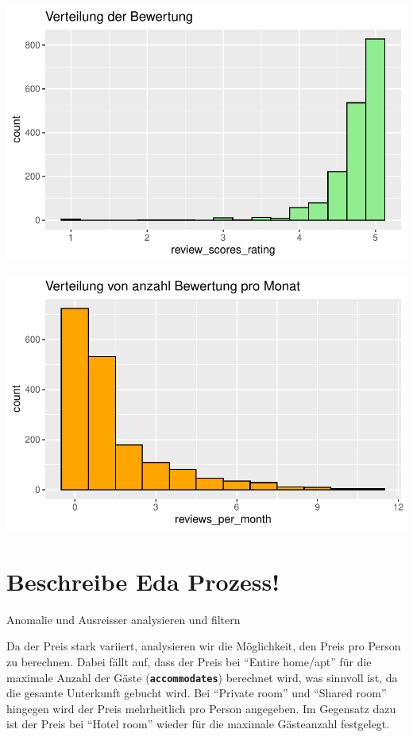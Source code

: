 \documentclass[
  journal,
]{IEEEtran}%
\begin{document}
\includegraphics{main_files/figure-pdf/eda-2.pdf}

\includegraphics{main_files/figure-pdf/eda-3.pdf}

\section{Beschreibe Eda Prozess!}\label{beschreibe-eda-prozess}

Anomalie und Ausreisser analysieren und filtern

Da der Preis stark variiert, analysieren wir die Möglichkeit, den Preis
pro Person zu berechnen. Dabei fällt auf, dass der Preis bei ``Entire
home/apt'' für die maximale Anzahl der Gäste
(\textbf{\texttt{accommodates}}) berechnet wird, was sinnvoll ist, da
die gesamte Unterkunft gebucht wird. Bei ``Private room'' und ``Shared
room'' hingegen wird der Preis mehrheitlich pro Person angegeben. Im
Gegensatz dazu ist der Preis bei ``Hotel room'' wieder für die maximale
Gästeanzahl festgelegt.
\end{document}
